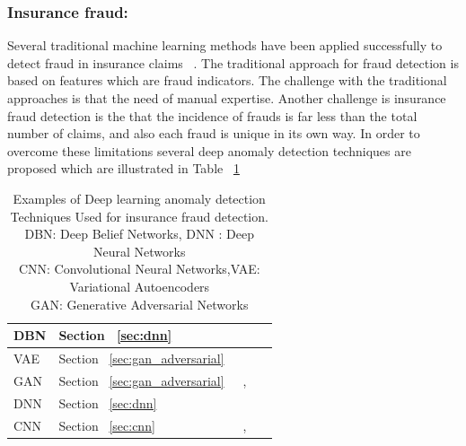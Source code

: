 \subsubsection{Insurance fraud:}
Several traditional machine learning methods have been applied successfully to detect fraud in insurance claims ~\cite{joudaki2015using,roy2017detecting}. The traditional approach for fraud detection is based on features which are fraud indicators. The challenge with the traditional approaches is that the need of manual expertise. Another challenge is insurance fraud detection is the that the incidence of frauds is far less than the total number of claims, and also each fraud is unique in its own way. In order to overcome these limitations several deep anomaly detection techniques are proposed which are illustrated in Table ~\ref{tab:insurancefraudDetect}

\begin{table}
\begin{center}
  \caption{Examples of Deep learning anomaly detection Techniques Used for insurance fraud detection.
          \\DBN: Deep Belief Networks, DNN : Deep Neural Networks
          \\CNN: Convolutional Neural Networks,VAE: Variational Autoencoders
          \\GAN: Generative Adversarial Networks}
  \label{tab:insurancefraudDetect}
    \begin{tabular}{ | l | p{2cm} | l | p{5cm} |}
    \hline
     DBN & Section ~\ref{sec:dnn} & ~\cite{viaene2005auto} \\\hline
     VAE & Section ~\ref{sec:gan_adversarial} & ~\cite{fajardo2018vos} \\\hline
     GAN & Section ~\ref{sec:gan_adversarial} & ~\cite{fiore2017using},~\cite{choi2018generative} \\\hline
     DNN & Section ~\ref{sec:dnn} &~\cite{keung2009neural}\\\hline
     CNN  & Section ~\ref{sec:cnn} & ~\cite{shen2007application},~\cite{zhang2018model}\\\hline
    \end{tabular}
\end{center}
\end{table}

